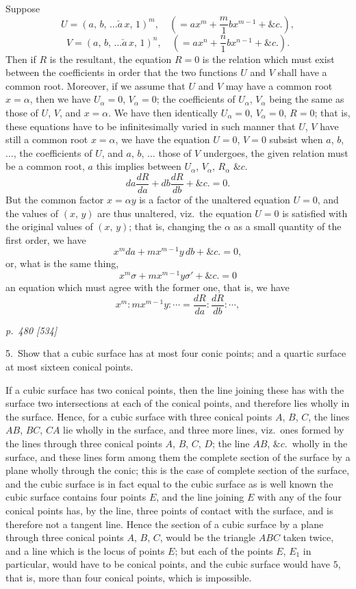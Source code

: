 \documentclass[11pt,a4paper]{book}
\begin{document}
Suppose
\[
U = (a,\,b,\,\ldots\check{a}\,x,\,1)^m, \quad \left(= a x^m + \frac{m}{1}b x^{m-1} + \&c.\right),
\]
\[
V = (a,\,b,\,\ldots\check{a}\,x,\,1)^n, \quad \left(= a x^n + \frac{n}{1}b x^{n-1} + \&c.\right).
\]
Then if $R$ is the resultant, the equation $R = 0$ is the relation which must exist
between the coefficients in order that the two functions $U$ and $V$ shall have a common root.
Moreover, if we assume that $U$ and $V$ may have a common root $x = \alpha$, then we have
$U_\alpha = 0$, $V_\alpha = 0$; the coefficients of $U_\alpha$, $V_\alpha$ being the same as those of $U$, $V$, and $x = \alpha$.
We have then identically $U_\alpha = 0$, $V_\alpha = 0$, $R = 0$; that is, these equations have to
be infinitesimally varied in such manner that $U$, $V$ have still a common root
$x = \alpha$, we have the equation $U = 0$, $V = 0$ subsist when $a$, $b$, $\ldots$, the coefficients of $U$,
and $a$, $b$, $\ldots$ those of $V$ undergoes, the given relation must be a common root, $a$ this implies between $U_\alpha$, $V_\alpha$, $R_\alpha$
$\&c.$
\[
da\frac{dR}{da} + db\frac{dR}{db} + \&c. = 0.
\]
But the common factor $x = \alpha y$ is a factor of the unaltered equation $U = 0$, and the
values of $(x,\,y)$ are thus unaltered, viz.\ the equation $U = 0$ is satisfied with the
original values of $(x,\,y)$; that is, changing the $\alpha$ as a small quantity of the first
order, we have
\[
x^m da + m x^{m-1} y\,db + \&c. = 0,
\]
or, what is the same thing,
\[
x^m\sigma + m x^{m-1}y\sigma' + \&c. = 0
\]
an equation which must agree with the former one, that is, we have
\[
x^m : m x^{m-1}y : \cdots = \frac{dR}{da} : \frac{dR}{db} : \cdots,
\]

\clearpage

\bigskip
\textit{p.~480 [534]}
\smallskip

\noindent\textsc{5.}\, Show that a cubic surface has at most four conic points; and a quartic
surface at most sixteen conical points.

If a cubic surface has two conical points, then the line joining these has with the
surface two intersections at each of the conical points, and therefore lies wholly in
the surface. Hence, for a cubic surface with three conical points $A$, $B$, $C$, the lines
$AB$, $BC$, $CA$ lie wholly in the surface, and three more lines, viz.\ ones formed by the lines through three conical points $A$, $B$, $C$, $D$;
the line $AB$, $\&c.$\ wholly in the surface, and these lines form among them the complete section
of the surface by a plane wholly through the conic; this is the case of complete
section of the surface, and the cubic surface is in fact equal to the cubic surface as is well known the cubic
surface contains four points $E$, and the line joining $E$ with any of the four
conical points has, by the line, three points of contact with the surface, and is therefore
not a tangent line. Hence the section of a cubic surface by a plane through three
conical points $A$, $B$, $C$, would be the triangle $ABC$ taken twice, and a line
which is the locus of points $E$; but each of the points $E$, $E_1$ in particular, would
have to be conical points, and the cubic surface would have $5$, that is, more than
four conical points, which is impossible.
\end{document}
